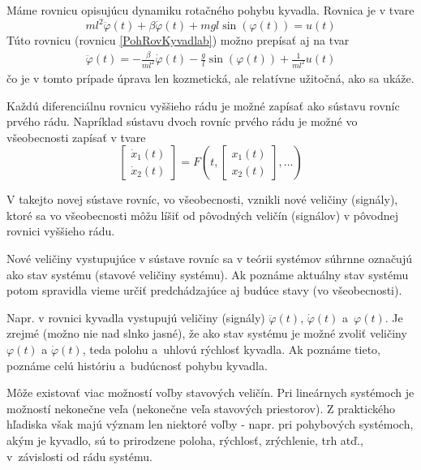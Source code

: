 \documentclass[a4paper, 10pt, ]{article}
\begin{document}
Máme rovnicu opisujúcu dynamiku rotačného pohybu kyvadla. Rovnica je v tvare
\begin{equation}
    ml^2 \ddot{\varphi}(t) + \beta \dot{\varphi}(t) + mgl\sin{\left(\varphi(t)\right)} = u(t)
\end{equation}
Túto rovnicu (rovnicu \eqref{PohRovKyvadlab}) možno prepísať aj na tvar
\begin{align}
	\ddot{\varphi}(t) = - \frac{\beta}{ml^2} \dot{\varphi}(t) - \frac{g}{l} \sin\left(\varphi(t)\right) + \frac{1}{ml^2}u(t)
\end{align}
čo je v tomto prípade úprava len kozmetická, ale relatívne užitočná, ako sa ukáže.


Každú diferenciálnu rovnicu vyššieho rádu je možné zapísať ako sústavu rovníc prvého rádu. Napríklad sústavu dvoch rovníc prvého rádu je možné vo všeobecnosti zapísať v tvare
\begin{equation} \label{naznak01}
   \begin{bmatrix} \dot x_1(t) \\ \dot x_2(t) \end{bmatrix} = F \left( t, \begin{bmatrix} x_1(t) \\ x_2(t) \end{bmatrix}, \ldots \right)
\end{equation}


V takejto novej sústave rovníc, vo všeobecnosti, vznikli nové veličiny (signály), ktoré sa vo všeobecnosti môžu líšiť od pôvodných veličín (signálov) v pôvodnej rovnici vyššieho rádu.

Nové veličiny vystupujúce v sústave rovníc sa v teórii systémov súhrnne označujú ako stav systému (stavové veličiny systému). Ak poznáme aktuálny stav systému potom spravidla vieme určiť predchádzajúce aj budúce stavy (vo všeobecnosti).

Napr. v rovnici kyvadla vystupujú veličiny (signály) $\ddot \varphi(t)$, $\dot \varphi(t)$ a~$\varphi(t)$. Je zrejmé (možno nie nad slnko jasné), že ako stav systému je možné zvoliť veličiny $\varphi(t)$ a $\dot \varphi(t)$, teda polohu a~uhlovú rýchlosť kyvadla. Ak poznáme tieto, poznáme celú históriu a~budúcnosť pohybu kyvadla.

Môže existovať viac možností voľby stavových veličín. Pri lineárnych systémoch je možností nekonečne veľa (nekonečne veľa stavových priestorov). Z praktického hľadiska však majú význam len niektoré voľby - napr. pri pohybových systémoch, akým je kyvadlo, sú to prirodzene poloha, rýchlosť, zrýchlenie, trh atď., v~závislosti od rádu systému.
\end{document}
